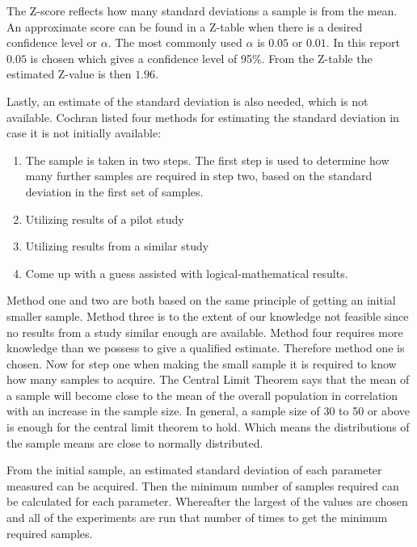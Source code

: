 The Z-score reflects how many standard deviations a sample is from the mean. An approximate score can be found in a Z-table when there is a desired confidence level or $\alpha$. The most commonly used $\alpha$ is $0.05$ or $0.01$.\cite{kotrlik2001organizational} In this report $0.05$ is chosen which gives a confidence level of 95\%. From the Z-table the estimated Z-value is then $1.96$. 

Lastly, an estimate of the standard deviation is also needed, which is not available. Cochran listed four methods for estimating the standard deviation in case it is not initially available:
\begin{enumerate}
    \item The sample is taken in two steps. The first step is used to determine how many further samples are required in step two, based on the standard deviation in the first set of samples.
    \item Utilizing results of a pilot study
    \item Utilizing results from a similar study
    \item Come up with a guess assisted with logical-mathematical results.
\end{enumerate}


Method one and two are both based on the same principle of getting an initial smaller sample. Method three is to the extent of our knowledge not feasible since no results from a study similar enough are available. Method four requires more knowledge than we possess to give a qualified estimate. Therefore method one is chosen. Now for step one when making the small sample it is required to know how many samples to acquire. The Central Limit Theorem says that the mean of a sample will become close to the mean of the overall population in correlation with an increase in the sample size. In general, a sample size of 30 to 50 or above is enough for the central limit theorem to hold. Which means the distributions of the sample means are close to normally distributed.


From the initial sample, an estimated standard deviation of each parameter measured can be acquired. Then the minimum number of samples required can be calculated for each parameter. Whereafter the largest of the values are chosen and all of the experiments are run that number of times to get the minimum required samples.



